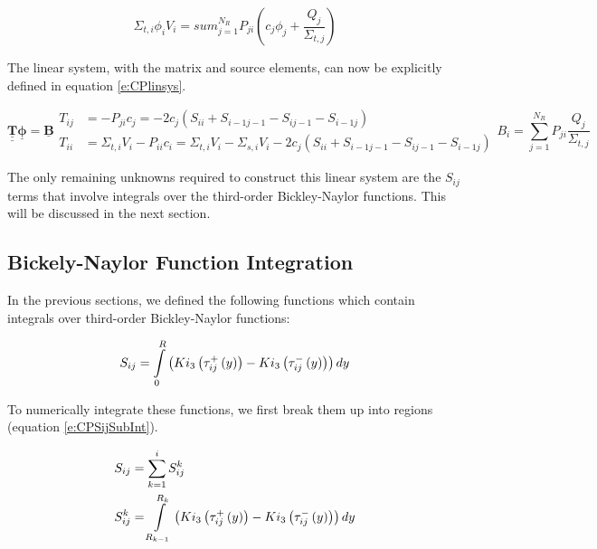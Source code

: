 \begin{equation}\label{e:CPproblem}
\Sigma_{t,i} \phi_i V_i = sum_{j=1}^{N_R} P_{ji}\left(c_j\phi_j + \frac{Q_j}{\Sigma_{t,j}}\right)
\end{equation}

The linear system, with the matrix and source elements, can now be explicitly defined in equation \ref{e:CPlinsys}.

\begin{subequations}\label{e:CPlinsys}
  \begin{equation}
  \underline{\underline{\bm T}}\underline{\bm\phi} = \underline{\bm B}
  \end{equation}
  \begin{align}
  T_{ij} &= -P_{ji} c_j = -2 c_j \left(S_{ii} + S_{i-1j-1} - S_{ij-1} - S_{i-1j}\right) \\
  T_{ii} &= \Sigma_{t,i} V_i - P_{ii} c_i = \Sigma_{t,i} V_i - \Sigma_{s,i} V_i - 2 c_j \left(S_{ii} + S_{i-1j-1} - S_{ij-1} - S_{i-1j}\right)
  \end{align}
  \begin{equation}
  B_i =\sum_{j=1}^{N_R} P_{ji} \frac{Q_j}{\Sigma_{t,j}}
  \end{equation}
\end{subequations}

The only remaining unknowns required to construct this linear system are the $S_{ij}$ terms that involve integrals over the third-order Bickley-Naylor functions.  This will be discussed in the next section.

\subsection{Bickely-Naylor Function Integration}

In the previous sections, we defined the following functions which contain integrals over third-order Bickley-Naylor functions:

\begin{equation}\label{e:CPSijDef}
S_{ij} = \intop_0^{R} \left(Ki_3\left(\tau_{ij}^+\left(y\right)\right) - Ki_3\left(\tau_{ij}^-\left(y\right)\right)\right) dy
\end{equation}

To numerically integrate these functions, we first break them up into regions (equation \ref{e:CPSijSubInt}).

\begin{subequations}\label{e:CPSijSubInt}
  \begin{align}
  S_{ij} &= \sum_{k=1}^i S_{ij}^k \\
  S_{ij}^k &= \intop_{R_{k-1}}^{R_k} \left(Ki_3\left(\tau_{ij}^+\left(y\right)\right) - Ki_3\left(\tau_{ij}^-\left(y\right)\right)\right) dy
  \end{align}
\end{subequations}

